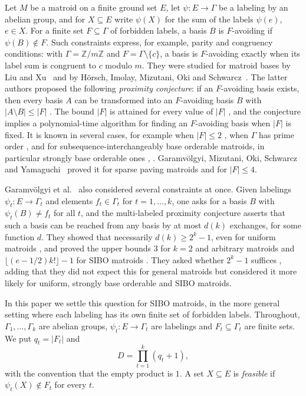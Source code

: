 \documentclass{amsart}
\theoremstyle{definition}
\theoremstyle{remark}
\newcommand{\Z}{\mathbb{Z}}
\begin{document}
Let $M$ be a matroid on a finite ground set $E$, let $\psi\colon E\to\Gamma$ be a labeling by an abelian group, and for $X\subseteq E$ write $\psi(X)$ for the sum of the labels $\psi(e)$, $e\in X$. For a finite set $F\subseteq\Gamma$ of forbidden labels, a basis $B$ is $F$-avoiding if $\psi(B)\notin F$. Such constraints express, for example, parity and congruency conditions: with $\Gamma=\Z/m\Z$ and $F=\Gamma\setminus\{c\}$, a basis is $F$-avoiding exactly when its label sum is congruent to $c$ modulo $m$. They were studied for matroid bases by Liu and Xu~\cite{LX} and by H\"orsch, Imolay, Mizutani, Oki and Schwarcz~\cite{HIMOS,HIMOS-full}. The latter authors proposed the following \emph{proximity conjecture}: if an $F$-avoiding basis exists, then every basis $A$ can be transformed into an $F$-avoiding basis $B$ with $|A\setminus B|\le|F|$ \cite[Conjecture~5.1]{HIMOS-full}. The bound $|F|$ is attained for every value of $|F|$ \cite[Section~5]{HIMOS-full}, and the conjecture implies a polynomial-time algorithm for finding an $F$-avoiding basis when $|F|$ is fixed. It is known in several cases, for example when $|F|\le2$ \cite{HIMOS-full}, when $\Gamma$ has prime order \cite{LX}, and for subsequence-interchangeably base orderable matroids, in particular strongly base orderable ones \cite[Corollary~5.15 and Remark~5.16]{HIMOS-full}, \cite[Lemma~2.4]{GMOSY}. Garamv\"olgyi, Mizutani, Oki, Schwarcz and Yamaguchi~\cite{GMOSY} proved it for sparse paving matroids and for $|F|\le4$.

Garamv\"olgyi et al.~\cite{GMOSY} also considered several constraints at once. Given labelings $\psi_t\colon E\to\Gamma_t$ and elements $f_t\in\Gamma_t$ for $t=1,\dots,k$, one asks for a basis $B$ with $\psi_t(B)\ne f_t$ for all $t$, and the multi-labeled proximity conjecture \cite[Conjecture~1.6]{GMOSY} asserts that such a basis can be reached from any basis by at most $d(k)$ exchanges, for some function $d$. They showed that necessarily $d(k)\ge2^k-1$, even for uniform matroids \cite[Example~5.1]{GMOSY}, and proved the upper bounds $3$ for $k=2$ and arbitrary matroids and $\lfloor(e-1/2)k!\rfloor-1$ for SIBO matroids \cite[Theorem~5.5]{GMOSY}. They asked whether $2^k-1$ suffices \cite[Question~6.2]{GMOSY}, adding that they did not expect this for general matroids but considered it more likely for uniform, strongly base orderable and SIBO matroids.

In this paper we settle this question for SIBO matroids, in the more general setting where each labeling has its own finite set of forbidden labels. Throughout, $\Gamma_1,\dots,\Gamma_k$ are abelian groups, $\psi_t\colon E\to\Gamma_t$ are labelings and $F_t\subseteq\Gamma_t$ are finite sets. We put $q_t=|F_t|$ and
\[
D=\prod_{t=1}^k(q_t+1),
\]
with the convention that the empty product is $1$. A set $X\subseteq E$ is \emph{feasible} if $\psi_t(X)\notin F_t$ for every $t$.
\end{document}
